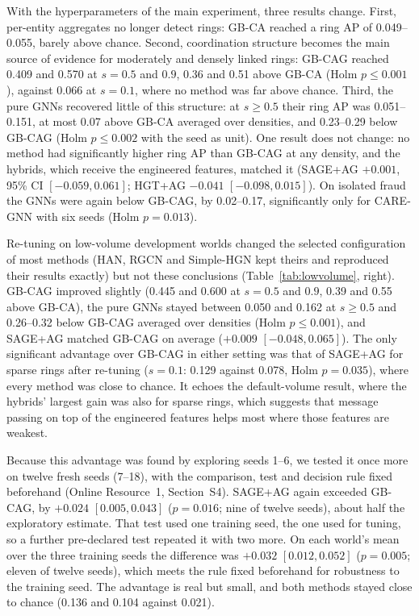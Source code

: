 \documentclass[pdflatex,sn-vancouver-num]{sn-jnl}
\newcommand{\SSecConfirm}{S4}
\begin{document}
With the hyperparameters of the main experiment, three results change.
First, per-entity aggregates no longer detect rings: GB-CA reached a ring AP
of 0.049--0.055, barely above chance. Second,
coordination structure becomes the main source of evidence for moderately
and densely linked rings: GB-CAG reached 0.409 and 0.570 at $s=0.5$ and
$0.9$, 0.36 and 0.51 above GB-CA (Holm $p\le0.001$), against 0.066 at
$s=0.1$, where no method was far above chance. Third, the pure GNNs
recovered little of this structure: at $s\ge0.5$ their ring AP was
0.051--0.151, at most 0.07 above GB-CA averaged over densities, and
0.23--0.29 below GB-CAG (Holm $p\le0.002$ with the seed as unit). One result
does not change: no method had significantly higher ring AP than GB-CAG at
any density, and the hybrids, which receive the engineered features, matched
it (SAGE+AG $+0.001$, 95\% CI $[-0.059, 0.061]$; HGT+AG $-0.041$
$[-0.098, 0.015]$). On isolated fraud the GNNs were again below GB-CAG, by
0.02--0.17, significantly only for CARE-GNN with six seeds (Holm $p=0.013$).

Re-tuning on low-volume development worlds changed the selected configuration
of most methods (HAN, RGCN and Simple-HGN kept theirs and reproduced their
results exactly) but not these conclusions (Table~\ref{tab:lowvolume},
right). GB-CAG improved slightly (0.445 and 0.600 at $s=0.5$ and $0.9$, 0.39
and 0.55 above GB-CA), the pure GNNs stayed between 0.050 and 0.162 at
$s\ge0.5$ and 0.26--0.32 below GB-CAG averaged over densities (Holm
$p\le0.001$), and SAGE+AG matched GB-CAG on average ($+0.009$
$[-0.048, 0.065]$). The only significant advantage over GB-CAG in either
setting was that of SAGE+AG for sparse rings after re-tuning ($s=0.1$:
0.129 against 0.078, Holm $p=0.035$), where every method was close to
chance. It echoes the default-volume result, where the hybrids' largest gain
was also for sparse rings, which suggests that message passing on top of the
engineered features helps most where those features are weakest.

Because this advantage was found by exploring seeds 1--6, we tested it once
more on twelve fresh seeds (7--18), with the comparison, test and decision
rule fixed beforehand (Online Resource~1, Section~\SSecConfirm). SAGE+AG again
exceeded GB-CAG, by $+0.024$ $[0.005, 0.043]$ ($p=0.016$; nine of twelve
seeds), about half the exploratory estimate. That test used one training
seed, the one used for tuning, so a further pre-declared test repeated it with
two more. On each world's mean over the three training seeds the difference
was $+0.032$ $[0.012, 0.052]$ ($p=0.005$; eleven of twelve seeds), which meets
the rule fixed beforehand for robustness to the training seed. The advantage is
real but small, and both methods stayed close to chance (0.136 and 0.104
against 0.021).
\end{document}
